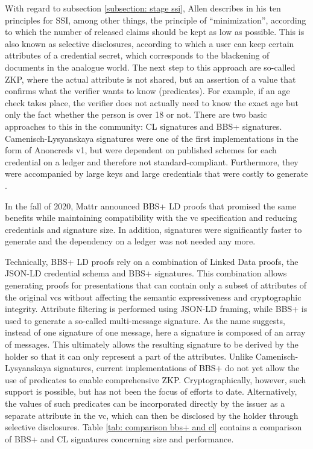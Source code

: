 		With regard to subsection \ref{subsection: stage ssi}, Allen describes in his ten principles for SSI, among other things, the principle of “minimization”, according to which the number of released claims should be kept as low as possible. This is also known as selective disclosures, according to which a user can keep certain attributes of a credential secret, which corresponds to the blackening of documents in the analogue world. The next step to this approach are so-called \ac{ZKP}, where the actual attribute is not shared, but an assertion of a value that confirms what the verifier wants to know (predicates). For example, if an age check takes place, the verifier does not actually need to know the exact age but only the fact whether the person is over 18 or not. There are two basic approaches to this in the community: \acf{CL} signatures and BBS+ signatures. Camenisch-Lysyanskaya signatures were one of the first implementations in the form of Anoncreds v1, but were dependent on published schemes for each credential on a ledger and therefore not standard-compliant. Furthermore, they were accompanied by large keys and large credentials that were costly to generate \cite{zundel_why_2021}. \cite[pp. 17-18]{young_verifiable_2021}
		
		In the fall of 2020, Mattr announced BBS+ LD proofs that promised the same benefits while maintaining compatibility with the \ac{vc} specification and reducing credentials and signature size. In addition, signatures were significantly faster to generate and the dependency on a ledger was not needed any more. \cite{zundel_why_2021}
		
		Technically, BBS+ LD proofs rely on a combination of Linked Data proofs, the JSON-LD credential schema and BBS+ signatures. This combination allows generating proofs for presentations that can contain only a subset of attributes of the original \acp{vc} without affecting the semantic expressiveness and cryptographic integrity. Attribute filtering is performed using JSON-LD framing, while BBS+ is used to generate a so-called multi-message signature. As the name suggests, instead of one signature of one message, here a signature is composed of an array of messages. This ultimately allows the resulting signature to be derived by the holder so that it can only represent a part of the attributes. Unlike Camenisch-Lysyanskaya signatures, current implementations of BBS+ do not yet allow the use of predicates to enable comprehensive \ac{ZKP}. Cryptographically, however, such support is possible, but has not been the focus of efforts to date. Alternatively, the values of such predicates can be incorporated directly by the issuer as a separate attribute in the \ac{vc}, which can then be disclosed by the holder through selective disclosures. Table \ref{tab: comparison bbs+ and cl} contains a comparison of BBS+ and \ac{CL} signatures concerning size and performance.
		
